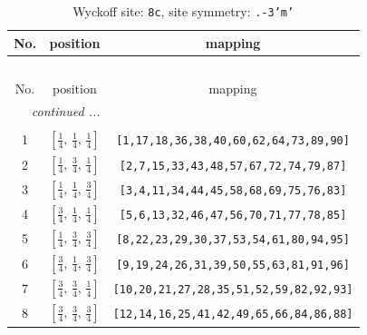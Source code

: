 \documentclass[fleqn,8pt]{jsarticle}
\begin{document}
\begin{longtable}{ccc}
\caption{Wyckoff site: {\tt 8c}, site symmetry: {\tt .-3'm'}}
 \\
 \hline \hline
No. & position & mapping \\ \hline \endfirsthead

\multicolumn{2}{l}{\tablename\ \thetable{}} \\
 \hline \hline
No. & position & mapping \\ \hline \endhead

 \hline \hline
\multicolumn{2}{r}{\footnotesize\it continued ...} \\ \endfoot

 \hline \hline
\multicolumn{2}{r}{} \\ \endlastfoot

1 & $\left[ \frac{1}{4},\, \frac{1}{4},\, \frac{1}{4} \right]$ & {\tt [1,17,18,36,38,40,60,62,64,73,89,90]} \\ \hline
2 & $\left[ \frac{1}{4},\, \frac{3}{4},\, \frac{1}{4} \right]$ & {\tt [2,7,15,33,43,48,57,67,72,74,79,87]} \\ \hline
3 & $\left[ \frac{1}{4},\, \frac{1}{4},\, \frac{3}{4} \right]$ & {\tt [3,4,11,34,44,45,58,68,69,75,76,83]} \\ \hline
4 & $\left[ \frac{3}{4},\, \frac{1}{4},\, \frac{1}{4} \right]$ & {\tt [5,6,13,32,46,47,56,70,71,77,78,85]} \\ \hline
5 & $\left[ \frac{1}{4},\, \frac{3}{4},\, \frac{3}{4} \right]$ & {\tt [8,22,23,29,30,37,53,54,61,80,94,95]} \\ \hline
6 & $\left[ \frac{3}{4},\, \frac{1}{4},\, \frac{3}{4} \right]$ & {\tt [9,19,24,26,31,39,50,55,63,81,91,96]} \\ \hline
7 & $\left[ \frac{3}{4},\, \frac{3}{4},\, \frac{1}{4} \right]$ & {\tt [10,20,21,27,28,35,51,52,59,82,92,93]} \\ \hline
8 & $\left[ \frac{3}{4},\, \frac{3}{4},\, \frac{3}{4} \right]$ & {\tt [12,14,16,25,41,42,49,65,66,84,86,88]} \\
\end{longtable}
\renewcommand{\arraystretch}{1.2}
\end{document}
